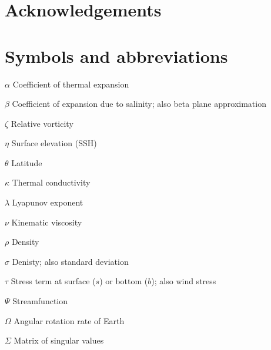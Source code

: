 \documentclass[a4paper,12pt, openright, titlepage]{book}
\begin{document}
\chapter{Acknowledgements}

\clearpage

\chapter{Symbols and abbreviations}
\begin{abbrv}

\item[$\alpha$]              Coefficient of thermal expansion\\
\item[$\beta$]               Coefficient of expansion due to salinity; also beta plane approximation\\
\item[$\zeta$]               Relative vorticity\\
\item[$\eta$]                Surface elevation (SSH)\\
\item[$\theta$]              Latitude\\
\item[$\kappa$]              Thermal conductivity\\
\item[$\lambda$]             Lyapunov exponent\\
\item[$\nu$]                 Kinematic viscosity\\
\item[$\rho$]                Density\\
\item[$\sigma$]              Denisty; also standard deviation\\    
\item[$\tau$]                Stress term at surface ($s$) or bottom ($b$); also wind stress\\
\item[$\Psi$]                Streamfunction\\
\item[$\Omega$]              Angular rotation rate of Earth\\
\item[$\Sigma$]              Matrix of singular values\\

\end{abbrv}
\end{document}
